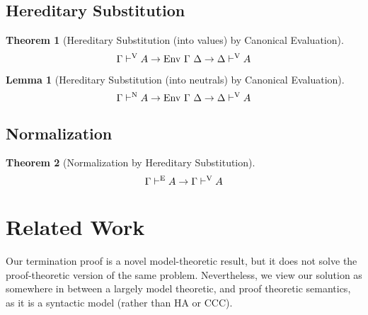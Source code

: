 \documentclass[preprint,nonatbib]{sigplanconf}
\numberwithin{subdefin}{defin}
\newtheorem{theorem}{Theorem}
\newtheorem{subtheorem}{Lemma}
\numberwithin{subtheorem}{theorem}
\def\dfn{\mapsto}
\def\arr{\supset}
\def\marr{\rightarrow}
\newcommand{\turn}[1]{\vdash^\con{#1}}
\newcommand{\el}[1]{\llbracket ~ #1 ~ \rrbracket}
\newcommand{\con}[1]{\textmd{#1}}
\newcommand{\fun}[1]{\textmd{#1}}
\newcommand{\typm}[1]{\el{\Gamma \vdash #1}}
\newcommand{\dtypm}[1]{\el{\Delta \vdash #1}}
\newcommand{\type}[1]{\Gamma \turn{E} #1}
\newcommand{\typv}[1]{\Gamma \turn{V} #1}
\newcommand{\dtypv}[1]{\Delta \turn{V} #1}
\newcommand{\typn}[1]{\Gamma \turn{N} #1}
\def\env{\fun{Env}~\Gamma~\Delta}
\begin{document}
\subsection{Hereditary Substitution}

\begin{theorem}[Hereditary Substitution (into values) by Canonical Evaluation]
\label{thm:mod:vhsub}
$$
\typv{A} \marr \env \marr \dtypv{A}
$$
\end{theorem}

\begin{subtheorem}[Hereditary Substitution (into neutrals) by Canonical Evaluation]
\label{thm:mod:nhsub}
$$
\typn{A} \marr \env \marr \dtypv{A}
$$
\end{subtheorem}

\subsection{Normalization}

\begin{theorem}[Normalization by Hereditary Substitution]
\label{thm:mod:vnorm}
$$
\type{A} \marr \typv{A}
$$
\end{theorem}






\section{Related Work}

Our termination proof is a novel model-theoretic result, but it
does not solve the proof-theoretic version of the same problem.
Nevertheless, we view our solution as somewhere in between a largely
model theoretic, and proof theoretic semantics, as it is a syntactic
model (rather than HA or CCC).

\end{document}
